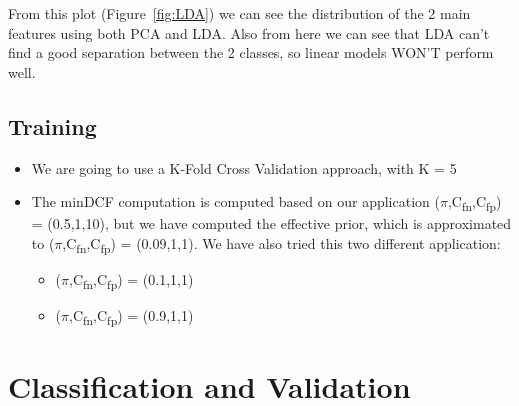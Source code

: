\documentclass[english]{report}
\begin{document}
    From this plot (Figure~\ref{fig:LDA}) we can see the distribution of the 2 main features using both PCA and LDA. Also from
    here we can see that LDA can't find a good separation between the 2 classes, so linear models WON'T 
    perform well.

\section{Training}
    \begin{itemize}
        \item We are going to use a K-Fold Cross Validation approach, with K = 5
        \item The minDCF computation is computed based on our application ($\pi$,C\textsubscript{fn},C\textsubscript{fp}) = (0.5,1,10), but we have
        computed the effective prior, which is approximated to ($\pi$,C\textsubscript{fn},C\textsubscript{fp}) = (0.09,1,1).\newline
        We have also tried this two different application:
        \begin{itemize}
            \item ($\pi$,C\textsubscript{fn},C\textsubscript{fp}) = (0.1,1,1)
            \item ($\pi$,C\textsubscript{fn},C\textsubscript{fp}) = (0.9,1,1)
        \end{itemize}
    \end{itemize}

\chapter{Classification and Validation}
\end{document}
